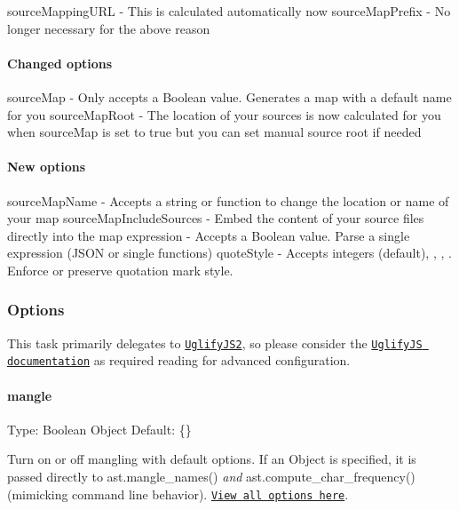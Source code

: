 {\ttfamily source\+Mapping\+U\+RL} -\/ This is calculated automatically now {\ttfamily source\+Map\+Prefix} -\/ No longer necessary for the above reason

\paragraph*{Changed options}

{\ttfamily source\+Map} -\/ Only accepts a {\ttfamily Boolean} value. Generates a map with a default name for you {\ttfamily source\+Map\+Root} -\/ The location of your sources is now calculated for you when {\ttfamily source\+Map} is set to {\ttfamily true} but you can set manual source root if needed

\paragraph*{New options}

{\ttfamily source\+Map\+Name} -\/ Accepts a string or function to change the location or name of your map {\ttfamily source\+Map\+Include\+Sources} -\/ Embed the content of your source files directly into the map {\ttfamily expression} -\/ Accepts a {\ttfamily Boolean} value. Parse a single expression (J\+S\+ON or single functions) {\ttfamily quote\+Style} -\/ Accepts integers {} (default), {}, {}, {}. Enforce or preserve quotation mark style.

\subsubsection*{Options}

This task primarily delegates to \href{https://github.com/mishoo/UglifyJS2}{\tt Uglify\+J\+S2}, so please consider the \href{http://lisperator.net/uglifyjs/}{\tt Uglify\+JS documentation} as required reading for advanced configuration.

\paragraph*{mangle}

Type\+: {\ttfamily Boolean} {\ttfamily Object} Default\+: {\ttfamily \{\}}

Turn on or off mangling with default options. If an {\ttfamily Object} is specified, it is passed directly to {\ttfamily ast.\+mangle\+\_\+names()} {\itshape and} {\ttfamily ast.\+compute\+\_\+char\+\_\+frequency()} (mimicking command line behavior). \href{https://github.com/mishoo/UglifyJS2#mangler-options}{\tt View all options here}.

